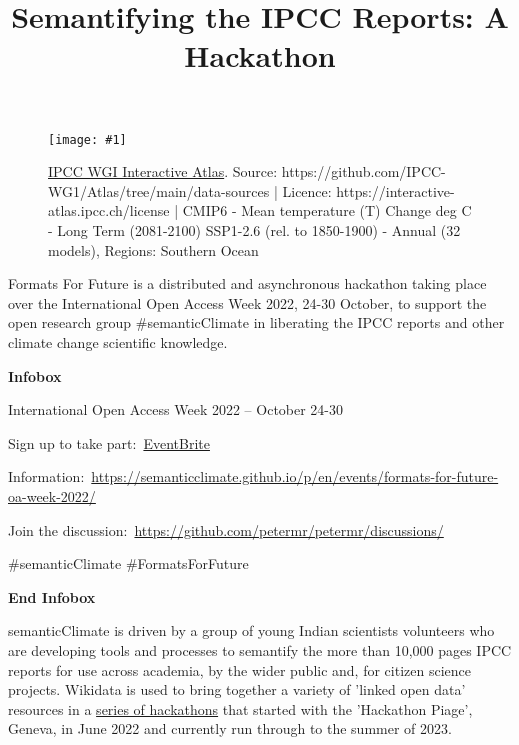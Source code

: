 \documentclass{article}
\newlength{\imgwidth}
\newcommand\scaledgraphics[2]{%
                
\settowidth{\imgwidth}{\texttt{[image: \#1]}}%
                
\setlength{\imgwidth}{\minof{\imgwidth}{#2\textwidth}}%
                
\texttt{[image: \#1]}%
                
}
\begin{document}
\title{Semantifying the IPCC Reports: A Hackathon}

\maketitle




\begin{figure}
\scaledgraphics{5eb0dff6-45a1-424c-bf9f-af504d58799e.png}{1}
\caption*{\href{https://interactive-atlas.ipcc.ch/}{IPCC WGI Interactive Atlas}. Source: https://github.com/IPCC-WG1/Atlas/tree/main/data-sources | Licence: https://interactive-atlas.ipcc.ch/license | CMIP6 - Mean temperature (T) Change deg C - Long Term (2081-2100) SSP1-2.6 (rel. to 1850-1900) - Annual (32 models), Regions: Southern Ocean}\label{F59109301}
\end{figure}





Formats For Future is a distributed and asynchronous hackathon taking place over the International Open Access Week 2022, 24-30 October, to support the open research group \#semanticClimate in liberating the IPCC reports and other climate change scientific knowledge.


\textbf{Infobox}


International Open Access Week 2022 – October 24-30


Sign up to take part: \href{https://www.eventbrite.co.uk/e/formats-for-future-liberating-and-semantify-ipcc-reports-tickets-439057261087}{EventBrite}


Information: \href{https://semanticclimate.github.io/p/en/events/formats-for-future-oa-week-2022/}{https://semanticclimate.github.io/p/en/events/formats-for-future-oa-week-2022/}


Join the discussion: \href{https://github.com/petermr/petermr/discussions/}{https://github.com/petermr/petermr/discussions/}


\#semanticClimate \#FormatsForFuture


\textbf{End Infobox}


semanticClimate is driven by a group of young Indian scientists volunteers who are developing tools and processes to semantify the more than 10,000 pages IPCC reports for use across academia, by the wider public and, for citizen science projects. Wikidata is used to bring together a variety of 'linked open data' resources in a \href{https://semanticclimate.github.io/p/en/events/}{series of hackathons} that started with the 'Hackathon Piage', Geneva, in June 2022 and currently run through to the summer of 2023.
\end{document}
